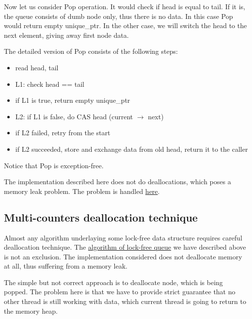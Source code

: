 \documentclass{article}
\begin{document}
Now let us consider Pop operation. It would check if head is equal to tail. If it is, the queue consists of dumb node only, thus there is no data. In this case Pop would return empty unique\_ptr. In the other case, we will switch the head to the next element, giving away first node data.

The detailed version of Pop consists of the following steps:
\begin{itemize}
	\item read head, tail
	\item L1: check head == tail
	\item if L1 is true, return empty unique\_ptr
	\item L2: if L1 is false, do CAS head (current $\rightarrow$ next)
	\item if L2 failed, retry from the start
	\item if L2 succeeded, store and exchange data from old head, return it to the caller
\end{itemize}

Notice that Pop is exception-free.

The implementation described here does not do deallocations, which poses a memory leak problem. The problem is handled \hyperref[subsec:dealloc_lock_free_queue]{here}.

\subsection{Multi-counters deallocation technique}
\label{subsec:three_counters}

Almost any algorithm underlaying some lock-free data structure requires careful deallocation technique. The \hyperref[subsec:lock_free_queue]{algorithm of lock-free queue} we have described above is not an exclusion. The implementation considered does not deallocate memory at all, thus suffering from a memory leak.

The simple but not correct approach is to deallocate node, which is being popped. The problem here is that we have to provide strict guarantee that no other thread is still working with data, which current thread is going to return to the memory heap.
\end{document}

